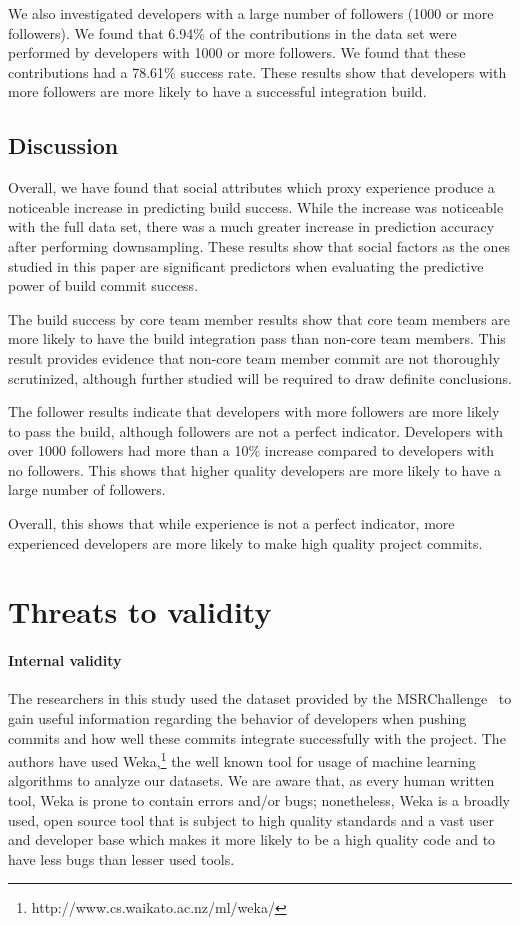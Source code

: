 \documentclass[10pt, conference]{IEEEtran}
\begin{document}
We also investigated developers with a large number of followers (1000 or more
followers).  We found that 6.94\% of the contributions in the data set were
performed by developers with 1000 or more followers.  We found that these
contributions had a 78.61\% success rate.  These results show that developers
with more followers are more likely to have a successful integration build.



\subsection{Discussion}

Overall, we have found that social attributes which proxy experience produce a 
noticeable increase in predicting build success.  While the increase was noticeable 
with the full data set, there was a much greater increase in prediction
accuracy after performing downsampling. These results show that social factors
as the ones studied in this paper are significant predictors when
evaluating the predictive power of build commit success.

The build success by core team member results show that core team members are
more likely to have the build integration pass than non-core team members.  This
result provides evidence that non-core team member commit are not thoroughly
scrutinized, although further studied will be required to draw definite
conclusions.

The follower results indicate that developers with more followers are more
likely to pass the build, although followers are not a perfect indicator.
Developers with over 1000 followers had more than a 10\% increase compared to
developers with no followers.  This shows that higher quality developers are more
likely to have a large number of followers.

Overall, this shows that while experience is not a perfect indicator, more
experienced developers are more likely to make high quality project commits.

\section{Threats to validity}

\paragraph{Internal validity}
The researchers in this study used the dataset provided by the 
 MSRChallenge~\cite{msr17challenge} to gain useful information regarding the 
 behavior of developers when pushing commits and how well these commits integrate 
 successfully with the project. The authors have used 
 Weka,\footnote{http://www.cs.waikato.ac.nz/ml/weka/} the well known tool for 
 usage of machine learning algorithms to analyze our datasets. We are aware that, 
 as every human written tool, Weka is prone to contain errors and/or bugs; 
 nonetheless, Weka is a broadly used, open source tool that is subject to high 
 quality standards and a vast user and developer base which makes it more likely 
 to be a high quality code and to have less bugs than lesser used tools.
 
\end{document}
